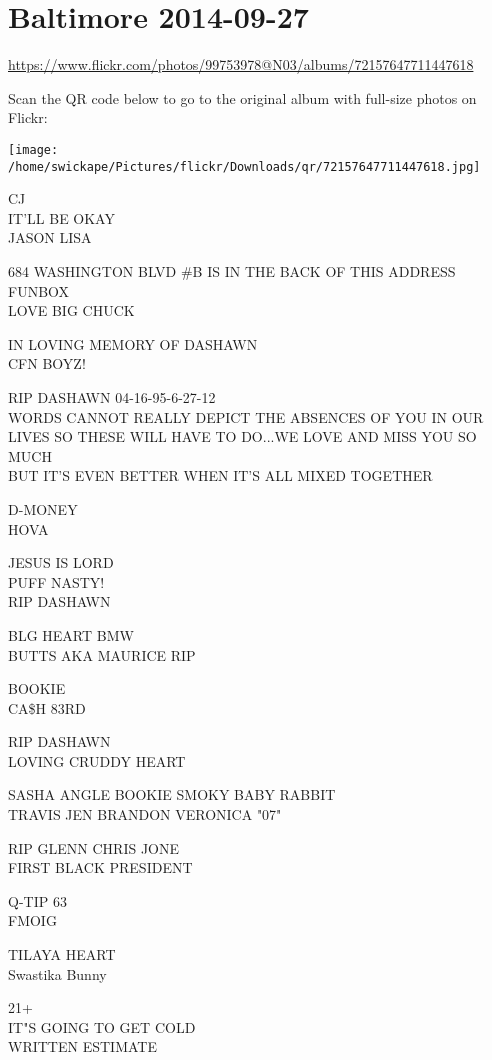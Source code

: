 \documentclass[10pt,letterpaper]{article}
\begin{document}
\section*{Baltimore 2014-09-27}

\url{https://www.flickr.com/photos/99753978@N03/albums/72157647711447618}

Scan the QR code below to go to the original album with full-size photos on Flickr:

\texttt{[image: /home/swickape/Pictures/flickr/Downloads/qr/72157647711447618.jpg]}


CJ\\
IT'LL BE OKAY\\
JASON LISA

684 WASHINGTON BLVD \#B IS IN THE BACK OF THIS ADDRESS\\
FUNBOX\\
LOVE BIG CHUCK

IN LOVING MEMORY OF DASHAWN\\
CFN BOYZ!

RIP DASHAWN 04{-}16{-}95{-}6{-}27{-}12\\
WORDS CANNOT REALLY DEPICT THE ABSENCES OF YOU IN OUR LIVES SO THESE WILL HAVE TO DO...WE LOVE AND MISS YOU SO MUCH\\
BUT IT'S EVEN BETTER WHEN IT'S ALL MIXED TOGETHER

D{-}MONEY\\
HOVA

JESUS IS LORD\\
PUFF NASTY!\\
RIP DASHAWN

BLG HEART BMW\\
BUTTS AKA MAURICE RIP

BOOKIE\\
CA\$H 83RD

RIP DASHAWN\\
LOVING CRUDDY HEART

SASHA ANGLE BOOKIE SMOKY BABY RABBIT\\
TRAVIS JEN BRANDON VERONICA "07"

RIP GLENN CHRIS JONE\\
FIRST BLACK PRESIDENT

Q{-}TIP 63\\
FMOIG

TILAYA HEART\\
Swastika Bunny

21+\\
IT"S GOING TO GET COLD\\
WRITTEN ESTIMATE
\end{document}
